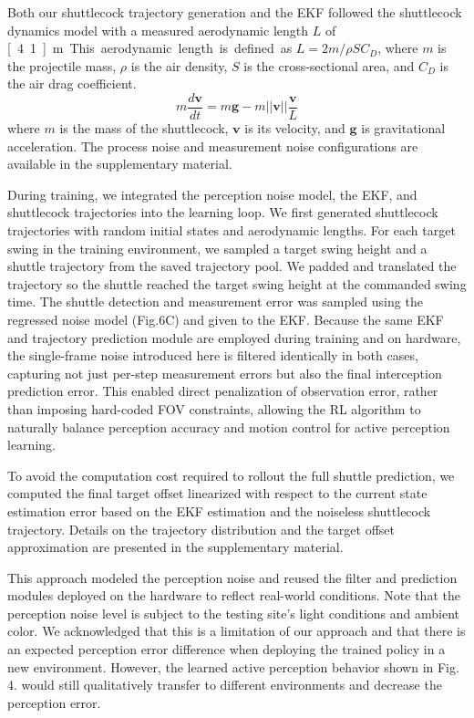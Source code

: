 \documentclass[9pt,twocolumn,twoside]{osajnl}
\begin{document}
Both our shuttlecock trajectory generation and the \ac{EKF} followed the shuttlecock dynamics model \cite{cohen2015physics} with a measured aerodynamic length $L$ of \unit[4.1]{m}. This aerodynamic length is defined as $L=2m/\rho SC_D$, where $m$ is the projectile mass, $\rho$ is the air density, $S$ is the cross-sectional area, and $C_D$ is the air drag coefficient.
\begin{equation}
    m\frac{d\mathbf{v}}{dt} = m\mathbf{g} - m||\mathbf{v}||\frac{\mathbf{v}}{L}
\end{equation}
where $m$ is the mass of the shuttlecock, $\mathbf{v}$ is its velocity, and $\mathbf{g}$ is gravitational acceleration. The process noise and measurement noise configurations are available in the supplementary material.

During training, we integrated the perception noise model, the \ac{EKF}, and shuttlecock trajectories into the learning loop. We first generated shuttlecock trajectories with random initial states and aerodynamic lengths. For each target swing in the training environment, we sampled a target swing height and a shuttle trajectory from the saved trajectory pool. We padded and translated the trajectory so the shuttle reached the target swing height at the commanded swing time. The shuttle detection and measurement error was sampled using the regressed noise model (Fig.6C) and given to the \ac{EKF}. Because the same EKF and trajectory prediction module are employed during training and on hardware, the single-frame noise introduced here is filtered identically in both cases, capturing not just per-step measurement errors but also the final interception prediction error. This enabled direct penalization of observation error, rather than imposing hard-coded \ac{FOV} constraints, allowing the RL algorithm to naturally balance perception accuracy and motion control for active perception learning.

To avoid the computation cost required to rollout the full shuttle prediction, we computed the final target offset linearized with respect to the current state estimation error based on the \ac{EKF} estimation and the noiseless shuttlecock trajectory. Details on the trajectory distribution and the target offset approximation are presented in the supplementary material.

This approach modeled the perception noise and reused the filter and prediction modules deployed on the hardware to reflect real-world conditions. Note that the perception noise level is subject to the testing site's light conditions and ambient color. We acknowledged that this is a limitation of our approach and that there is an expected perception error difference when deploying the trained policy in a new environment. However, the learned active perception behavior shown in Fig. 4. would still qualitatively transfer to different environments and decrease the perception error.
\end{document}

